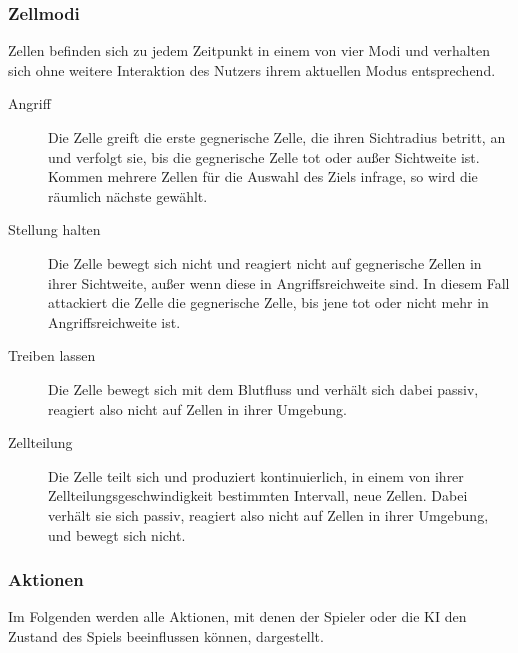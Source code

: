 \subsubsection{Zellmodi}
\label{sec:modi}

Zellen befinden sich zu jedem Zeitpunkt in einem von vier Modi und verhalten
sich ohne weitere Interaktion des Nutzers ihrem aktuellen Modus entsprechend.

\begin{description}
  \item[Angriff] Die Zelle greift die erste gegnerische Zelle, die ihren
    Sichtradius betritt, an und verfolgt sie, bis die gegnerische Zelle tot
    oder außer Sichtweite ist. Kommen mehrere Zellen für die Auswahl des
    Ziels infrage, so wird die räumlich nächste gewählt.
  \item[Stellung halten] Die Zelle bewegt sich nicht und reagiert nicht
    auf gegnerische Zellen in ihrer Sichtweite, außer wenn diese in
    Angriffsreichweite sind. In diesem Fall attackiert die Zelle die
    gegnerische Zelle, bis jene tot oder nicht mehr in Angriffsreichweite
    ist.
  \item[Treiben lassen] Die Zelle bewegt sich mit dem Blutfluss und
    verhält sich dabei passiv, reagiert also nicht auf Zellen in ihrer
    Umgebung.
  \item[Zellteilung] Die Zelle teilt sich und produziert kontinuierlich,
    in einem von ihrer Zellteilungsgeschwindigkeit bestimmten Intervall,
    neue Zellen. Dabei verhält sie sich passiv, reagiert also nicht auf
    Zellen in ihrer Umgebung, und bewegt sich nicht.
\end{description}

\subsubsection{Aktionen}
\label{sec:aktionen}

Im Folgenden werden alle Aktionen, mit denen der Spieler oder die KI den
Zustand des Spiels beeinflussen können, dargestellt.


\newcommand*{\oder}{\textbf{oder} }
\newcommand*{\actionentry}[5]{%
  \stepcounter{usecasect}
  \minisec{\theusecasect . #1}%
%
  \begin{tabular}{|l|p{9cm}|}%
    \hline%
    Akteur & #2\\%
    Startbedingung & #3\\%
    Schlussbedingung & #4\\%
    \hline%
  \end{tabular}%
%
  #5%
}


